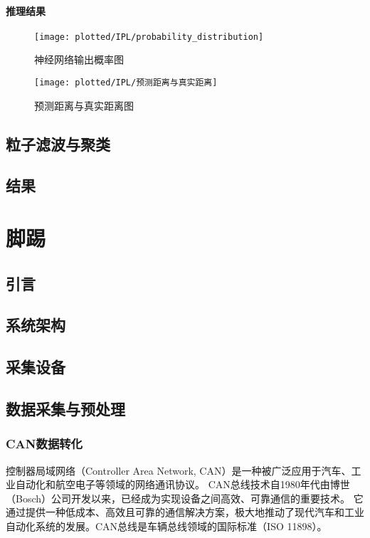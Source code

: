 \subsubsection{推理结果}
\begin{figure}[htbp]
    \centering
    \texttt{[image: plotted/IPL/probability\_distribution]}
    \caption{\label{fig:神经网络输出概率图}神经网络输出概率图}
\end{figure}


\begin{figure}[htbp]
    \centering
    \texttt{[image: plotted/IPL/预测距离与真实距离]}
    \caption{\label{fig:预测距离与真实距离图}预测距离与真实距离图}
\end{figure}

\section{粒子滤波与聚类}

\section{结果}


\chapter{脚踢}

\section{引言}

\section{系统架构}

\section{采集设备}


\section{数据采集与预处理}
\subsection{CAN数据转化}
控制器局域网络（Controller Area Network, CAN）是一种被广泛应用于汽车、工业自动化和航空电子等领域的网络通讯协议。
CAN总线技术自1980年代由博世（Bosch）公司开发以来，已经成为实现设备之间高效、可靠通信的重要技术。
它通过提供一种低成本、高效且可靠的通信解决方案，极大地推动了现代汽车和工业自动化系统的发展。CAN总线是车辆总线领域的国际标准（ISO 11898）\cite{Chen2009ResearchOT}。

